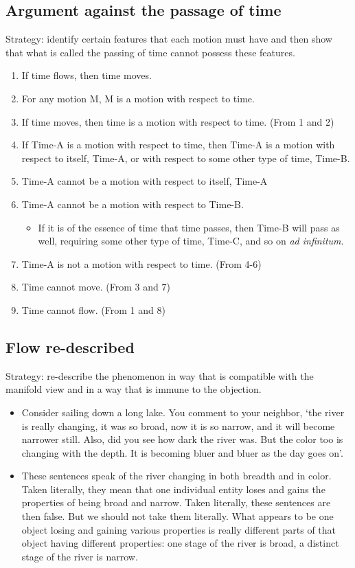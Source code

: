 \documentclass[oneside]{article}
\begin{document}
\subsection*{Argument against the passage of time}

\noindent Strategy: identify certain features that each motion must have and then show that what is called the passing of time cannot possess these features. 

\begin{enumerate} 
\item If time flows, then time moves. 
\item For any motion M, M is a motion with respect to time.
\item If time moves, then time is a motion with respect to time. (From 1 and 2) 
\item If Time-A is a motion with respect to time, then Time-A is a motion with respect to itself, Time-A, or with respect to some other type of time, Time-B.  
\item Time-A cannot be a motion with respect to itself, Time-A
\item Time-A cannot be a motion with respect to Time-B. 
\begin{itemize}
\item If it is of the essence of time that time passes, then Time-B will pass as well, requiring some other type of time, Time-C, and so on \emph{ad infinitum}. 
\end{itemize}
\item Time-A is not a motion with respect to time. (From 4-6)
\item Time cannot move. (From 3 and 7) 
\item Time cannot flow. (From 1 and 8)
\end{enumerate}

\subsection*{Flow re-described}

\noindent Strategy: re-describe the phenomenon in way that is compatible with the manifold view and in a way that is immune to the objection. 

\begin{itemize}
\item Consider sailing down a long lake. You comment to your neighbor, `the river is really changing, it was so broad, now it is so narrow, and it will become narrower still. Also, did you see how dark the river was. But the color too is changing with the depth. It is becoming bluer and bluer as the day goes on'. 
\item These sentences speak of the river changing in both breadth and in color. Taken literally, they mean that one individual entity loses and gains the properties of being broad and narrow. Taken literally, these sentences are then false. But we should not take them literally. What appears to be one object losing and gaining various properties is really different parts of that object having different properties: one stage of the river is broad, a distinct stage of the river is narrow. 
\end{itemize}
\end{document}
